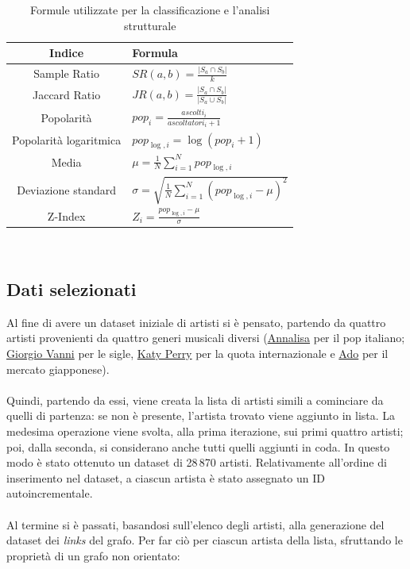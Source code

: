 \documentclass[sigchi]{acmart}
\begin{document}
\begin{table}[H]
\centering
\small
\begin{tabular}{|c|>{\centering\arraybackslash}p{4cm}|}
\hline
\textbf{Indice} & \textbf{Formula} \\
\hline
Sample Ratio &
$SR(a, b) = \frac{|S_a \cap S_b|}{k}$ \\
\hline
Jaccard Ratio &
$JR(a, b) = \frac{|S_a \cap S_b|}{|S_a \cup S_b|}$ \\
\hline
Popolarità &
$pop_i = \frac{ascolti_i}{ascoltatori_i + 1}$ \\
\hline
Popolarità logaritmica &
$pop_{\log,i} = \log(pop_i + 1)$ \\
\hline
Media &
$\mu = \frac{1}{N} \sum_{i=1}^{N} pop_{\log,i}$ \\
\hline
Deviazione standard &
$\sigma = \sqrt{\frac{1}{N} \sum_{i=1}^{N} (pop_{\log,i} - \mu)^2}$ \\
\hline
Z-Index &
$Z_i = \frac{pop_{\log,i} - \mu}{\sigma}$ \\
\hline
\end{tabular}\\[15pt]
\caption{Formule utilizzate per la classificazione e l'analisi strutturale}
\end{table}


\subsection{Dati selezionati}

Al fine di avere un dataset iniziale di artisti si è pensato, partendo da quattro artisti provenienti da quattro generi musicali diversi (\href{https://www.last.fm/music/Annalisa}{Annalisa} per il pop italiano; \href{https://www.last.fm/music/Giorgio+Vanni}{Giorgio Vanni} per le sigle, \href{https://www.last.fm/music/Katy+Perry}{Katy Perry} per la quota internazionale e \href{https://www.last.fm/music/Ado}{Ado} per il mercato giapponese). \\ \\ Quindi, partendo da essi, viene creata la lista di artisti simili a cominciare da quelli di partenza: se non è presente, l'artista trovato viene aggiunto in lista. La medesima operazione viene svolta, alla prima iterazione, sui primi quattro artisti; poi, dalla seconda, si considerano anche tutti quelli aggiunti in coda. In questo modo è stato ottenuto un dataset di 28\,870 artisti. Relativamente all'ordine di inserimento nel dataset, a ciascun artista è stato assegnato un ID autoincrementale. \\ \\ Al termine si è passati, basandosi sull'elenco degli artisti, alla generazione del dataset dei {\itshape links} del grafo. Per far ciò per ciascun artista della lista, sfruttando le proprietà di un grafo non orientato:
\end{document}
